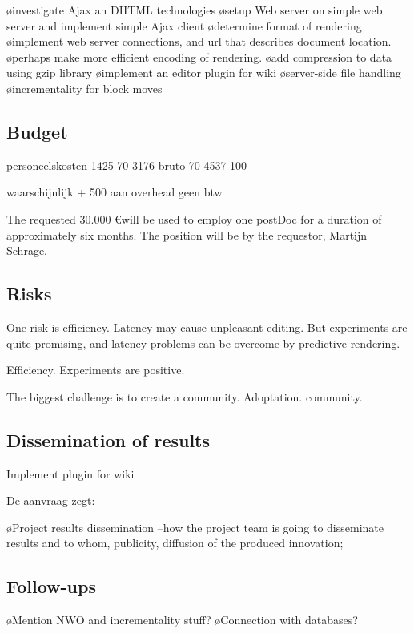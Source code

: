 \bl
\o investigate Ajax an DHTML technologies
\o setup Web server on simple web server and implement simple Ajax client
\o determine format of rendering
\o implement web server connections, and url that describes document location.
\o perhaps make more efficient encoding of rendering.
\o add compression to data using gzip library
\o implement an editor plugin for wiki
\o server-side file handling
\o incrementality for block moves
\el

\subsection{Budget}

\bc
personeelskosten
1425       70%
3176 bruto 70%
4537       100%

waarschijnlijk + 500 aan overhead
geen btw

\ec

The requested 30.000 \euro will be used to employ one postDoc for a duration of approximately six months. The position will be  by the requestor, Martijn Schrage.

\subsection{Risks}

One risk is efficiency. Latency may cause unpleasant editing. But experiments are quite promising, and latency problems can be overcome by predictive rendering. 

Efficiency. Experiments are positive.

The biggest challenge is to create a community. Adoptation. community. 

\subsection{Dissemination of results}

Implement plugin for wiki

De aanvraag zegt:

\bl
\o Project results dissemination --how the project team is going to disseminate results and to whom, publicity, diffusion of the produced innovation;
\el


\subsection{Follow-ups}


\bl
\o Mention NWO and incrementality stuff?
\o Connection with databases?
\el

